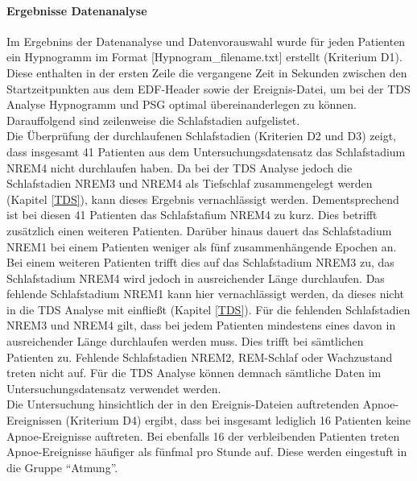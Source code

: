 \paragraph{Ergebnisse Datenanalyse} Im Ergebnins der Datenanalyse und Datenvorauswahl wurde für jeden Patienten ein Hypnogramm im Format [Hypnogram\_filename.txt] erstellt (Kriterium D1). Diese enthalten in der ersten Zeile die vergangene Zeit in Sekunden zwischen den Startzeitpunkten aus dem \acs{EDF}-Header sowie der Ereignis-Datei, um bei der \acs{TDS} Analyse Hypnogramm und \acs{PSG} optimal übereinanderlegen zu können. Darauffolgend sind zeilenweise die Schlafstadien aufgelistet.\\

Die Überprüfung der durchlaufenen Schlafstadien (Kriterien D2 und D3) zeigt, dass insgesamt 41 Patienten aus dem Untersuchungsdatensatz das Schlafstadium \acs{NREM}4 nicht durchlaufen haben. Da bei der \acs{TDS} Analyse jedoch die Schlafstadien \acs{NREM}3 und \acs{NREM}4 als Tiefschlaf zusammengelegt werden (Kapitel \ref{TDS}), kann dieses Ergebnis vernachlässigt werden. Dementsprechend ist bei diesen 41 Patienten das Schlafstafium \acs{NREM}4 zu kurz. Dies betrifft zusätzlich einen weiteren Patienten. Darüber hinaus dauert das Schlafstadium \acs{NREM}1 bei einem Patienten weniger als fünf zusammenhängende Epochen an. Bei einem weiteren Patienten trifft dies auf das Schlafstadium \acs{NREM}3 zu, das Schlafstadium \acs{NREM}4 wird jedoch in ausreichender Länge durchlaufen. Das fehlende Schlafstadium \acs{NREM}1 kann hier vernachlässigt werden, da dieses nicht in die \acs{TDS} Analyse mit einfließt (Kapitel \ref{TDS}). Für die fehlenden Schlafstadien \acs{NREM}3 und \acs{NREM}4 gilt, dass bei jedem Patienten mindestens eines davon in ausreichender Länge durchlaufen werden muss. Dies trifft bei sämtlichen Patienten zu. Fehlende Schlafstadien \acs{NREM}2, \acs{REM}-Schlaf oder Wachzustand treten nicht auf. Für die \acs{TDS} Analyse können demnach sämtliche Daten im Untersuchungsdatensatz verwendet werden.\\

Die Untersuchung hinsichtlich der in den Ereignis-Dateien auftretenden Apnoe-Ereignissen (Kriterium D4) ergibt, dass bei insgesamt lediglich 16 Patienten keine Apnoe-Ereignisse auftreten. Bei ebenfalls 16 der verbleibenden Patienten treten Apnoe-Ereignisse häufiger als fünfmal pro Stunde auf. Diese werden eingestuft in die Gruppe "`Atmung"'.\\

